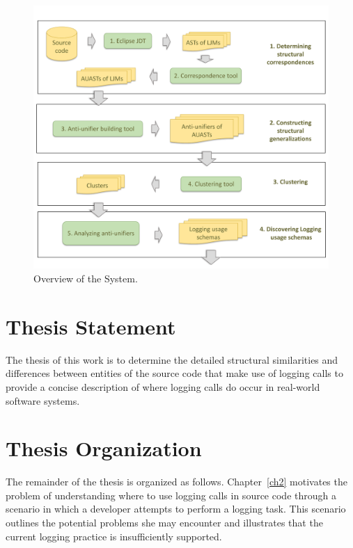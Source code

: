\begin{figure} [H]
  \centering\includegraphics [width = \textwidth]{Drawing4/SystemOverview.pdf}
  \caption{Overview of the System.}
  \label{fig:system_overview}
\end{figure}


\section{Thesis Statement} \label{intro-stmt}
The thesis of this work is to determine the detailed structural similarities and differences between entities of the source code that make use of logging calls to provide a concise description of where logging calls do occur in real-world software systems.

\section{Thesis Organization} \label{intro-org}
The remainder of the thesis is organized as follows. Chapter~\ref{ch2} motivates the problem of understanding where to use logging calls in source code through a scenario in which a developer attempts to perform a logging task. This scenario outlines the potential problems she may encounter and illustrates that the current logging practice is insufficiently supported.

